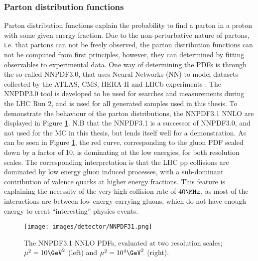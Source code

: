 \subsubsection*{Parton distribution functions}
\noindent
\justify
Parton distribution functions explain the probability to find a parton in a proton with some given energy fraction. 
Due to the non-perturbative nature of partons, i.e. that partons can not be freely observed, the parton distribution functions can not be computed from first principles, however, they can determined by fitting observables to experimental data. 
One way of determining the PDFs is through the so-called NNPDF3.0, that uses Neural Networks (NN) to model datasets collected by the ATLAS, CMS, HERA-II and LHCb experiments \cite{Ball:2014uwa}. 
The NNPDP3.0 tool is developed to be used for searches and measurements during the LHC Run 2, and is used for all generated samples used in this thesis. 
To demonstrate the behaviour of the parton distributions, the NNPDF3.1 NNLO are displayed in Figure \ref{fig:NNPDF31}. 
N.B that the NNPDF3.1 is a successor of NNPDF3.0, and not used for the MC in this thesis, but lends itself well for a demonstration. 
As can be seen in Figure \ref{fig:NNPDF31}, the red curve, corresponding to the gluon PDF scaled down by a factor of 10, is dominating at the low energies, for both resolution scales. 
The corresponding interpretation is that the LHC pp collisions are dominated by low energy gluon induced processes, with a sub-dominant contribution of valence quarks at higher energy fractions. 
This feature is explaining the necessity of the very high collision rate of $40\MHz$, as most of the interactions are between low-energy carrying gluons, which do not have enough energy to creat ``interesting'' physics events.  
\begin{figure}[!htp]
  \centering
   \texttt{[image: images/detector/NNPDF31.png]}
   \caption{The NNPDF3.1 NNLO PDFs, evaluated at two resolution scales; $\mu^{2}=10\GeV^{2}$ (left) and  $\mu^{2}=10^{4}\GeV^{2}$ (right)\cite{Ball:2017nwa}.}
   \label{fig:NNPDF31}
\end{figure}
